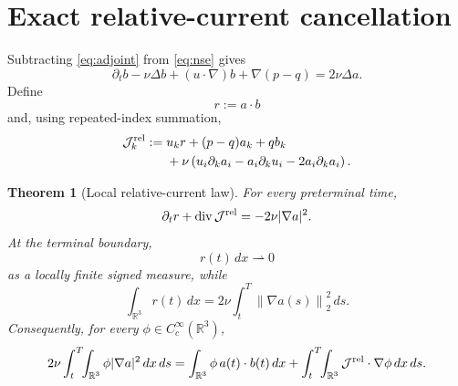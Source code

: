 \documentclass[11pt]{article}
\newtheorem{theorem}{Theorem}
\theoremstyle{remark}
\newcommand{\R}{\mathbb R}
\newcommand{\norm}[1]{\left\|#1\right\|}
\newcommand{\weakto}{\rightharpoonup}
\newcommand{\diver}{\mathop{\rm div}}
\begin{document}
\section{Exact relative-current cancellation}

Subtracting \eqref{eq:adjoint} from \eqref{eq:nse} gives
\begin{equation}
\label{eq:b-equation}
 \partial_tb-\nu\Delta b+(u\cdot\nabla)b+\nabla(p-q)
 =2\nu\Delta a.
\end{equation}
Define
\begin{equation}
\label{eq:r}
 r:=a\cdot b
\end{equation}
and, using repeated-index summation,
\begin{equation}
\label{eq:relative-current}
 \begin{aligned}
 \mathcal J_k^{\rm rel}:={}&
 u_kr+(p-q)a_k+qb_k\\
 &+\nu\left(
 u_i\partial_ka_i-a_i\partial_ku_i
 -2a_i\partial_ka_i
 \right).
 \end{aligned}
\end{equation}

\begin{theorem}[Local relative-current law]
\label{thm:relative-local}
For every preterminal time,
\begin{equation}
\label{eq:relative-law}
 \partial_tr+\diver\mathcal J^{\rm rel}
 =-2\nu|\nabla a|^2.
\end{equation}
At the terminal boundary,
\begin{equation}
\label{eq:r-zero}
 r(t)\,dx\weakto0
\end{equation}
as a locally finite signed measure, while
\begin{equation}
\label{eq:r-total}
 \int_{\R^3}r(t)\,dx
 =2\nu\int_t^T\norm{\nabla a(s)}_2^2\,ds.
\end{equation}
Consequently, for every \(\phi\in C_c^\infty(\R^3)\),
\begin{equation}
\label{eq:relative-representation}
 2\nu\int_t^T\!\!\int_{\R^3}\phi|\nabla a|^2\,dx\,ds
 =
 \int_{\R^3}\phi\,a(t)\cdot b(t)\,dx
 +\int_t^T\!\!\int_{\R^3}
 \mathcal J^{\rm rel}\cdot\nabla\phi\,dx\,ds.
\end{equation}
\end{theorem}
\end{document}

